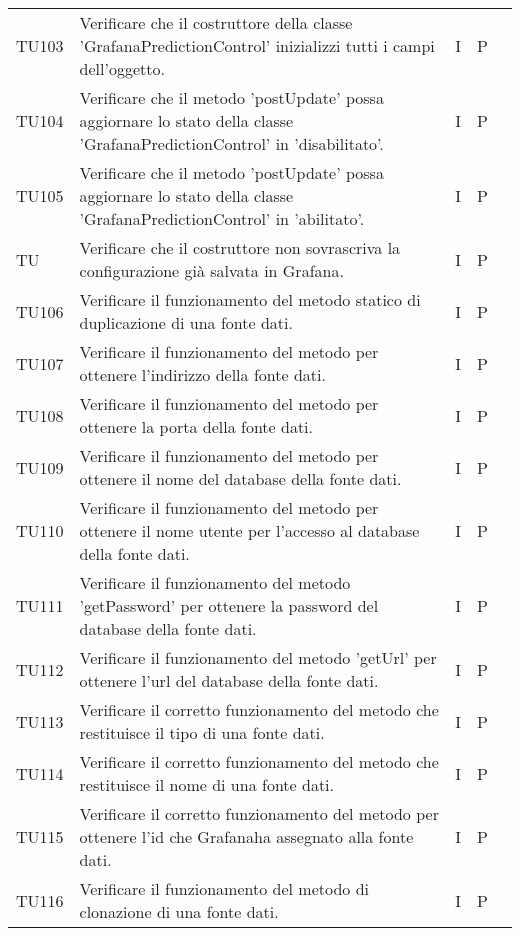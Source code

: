 \begin{longtable} {
		>{}p{15mm} 
		>{}p{79.5mm}
		>{}p{15mm} 
		>{}p{15mm}
		>{}p{0mm}}
	TU103		& Verificare che il costruttore della classe 'GrafanaPredictionControl' inizializzi tutti i campi dell'oggetto.& I & P &\TBstrut \\ [2mm]
	TU104		& Verificare che il metodo 'postUpdate' possa aggiornare lo stato della classe 'GrafanaPredictionControl' in 'disabilitato'.& I & P &\TBstrut \\ [2mm]
	TU105		& Verificare che il metodo 'postUpdate' possa aggiornare lo stato della classe 'GrafanaPredictionControl' in 'abilitato'.& I & P &\TBstrut \\ [2mm]
	TU	      	& Verificare che il costruttore non sovrascriva la configurazione già salvata in Grafana\glo.& I & P &\TBstrut \\ [2mm]
	TU106		& Verificare il funzionamento del metodo statico di duplicazione di una fonte dati.& I & P &\TBstrut \\ [2mm]
	TU107		& Verificare il funzionamento del metodo per ottenere l'indirizzo della fonte dati.& I & P &\TBstrut \\ [2mm]
	TU108		& Verificare il funzionamento del metodo per ottenere la porta della fonte dati.& I & P &\TBstrut \\ [2mm]
	TU109		& Verificare il funzionamento del metodo per ottenere il nome del database della fonte dati.& I & P &\TBstrut \\ [2mm]
	TU110		& Verificare il funzionamento del metodo per ottenere il nome utente per l'accesso al database della fonte dati.& I & P &\TBstrut \\ [2mm]
	TU111		& Verificare il funzionamento del metodo 'getPassword' per ottenere la password del database della fonte dati.& I & P &\TBstrut \\ [2mm]
	TU112		& Verificare il funzionamento del metodo 'getUrl' per ottenere l'url del database della fonte dati.& I & P &\TBstrut \\ [2mm]
	TU113		& Verificare il corretto funzionamento del metodo che restituisce il tipo di una fonte dati. & I & P &\TBstrut \\ [2mm]
	TU114		& Verificare il corretto funzionamento del metodo che restituisce il nome di una fonte dati. & I & P &\TBstrut \\ [2mm]
	TU115		& Verificare il corretto funzionamento del metodo per ottenere l'id che Grafana\glosp ha assegnato alla fonte dati. & I & P &\TBstrut \\ [2mm]
	TU116		& Verificare il funzionamento del metodo di clonazione di una fonte dati.& I & P &\TBstrut \\ [2mm]

\end{longtable}
